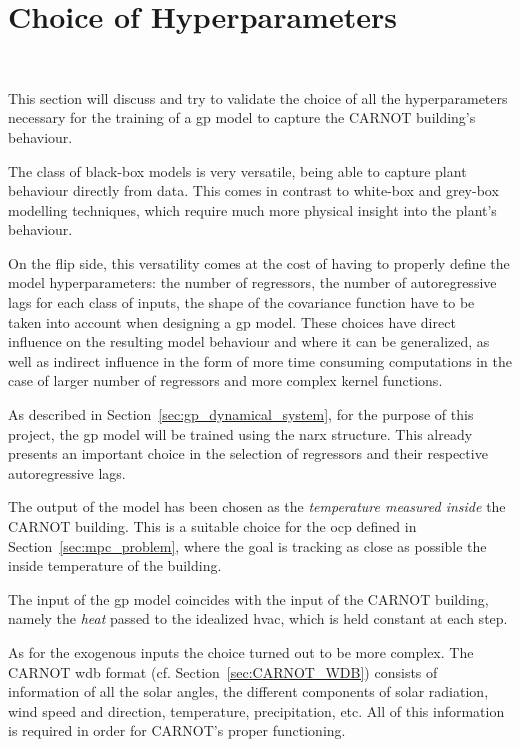 \section{Choice of Hyperparameters}~\label{sec:hyperparameters}

This section will discuss and try to validate the choice of all the
hyperparameters necessary for the training of a \acrshort{gp} model to capture
the CARNOT building's behaviour.

The class of black-box models is very versatile, being able to capture plant
behaviour directly from data. This comes in contrast to white-box and grey-box
modelling techniques, which require much more physical insight into the plant's
behaviour.

On the flip side, this versatility comes at the cost of having to properly
define the model hyperparameters: the number of regressors, the number of
autoregressive lags for each class of inputs, the shape of the covariance
function have to be taken into account when designing a \acrshort{gp} model.
These choices have direct influence on the resulting model behaviour and where
it can be generalized, as well as indirect influence in the form of more time
consuming computations in the case of larger number of regressors and more
complex kernel functions.

As described in Section~\ref{sec:gp_dynamical_system}, for the purpose of this
project, the \acrshort{gp} model will be trained using the \acrshort{narx}
structure. This already presents an important choice in the selection of
regressors and their respective autoregressive lags.

The output of the model has been chosen as the \textit{temperature measured
inside} the CARNOT building. This is a suitable choice for the \acrshort{ocp}
defined in Section~\ref{sec:mpc_problem}, where the goal is tracking as close as
possible the inside temperature of the building.

The input of the \acrshort{gp} model coincides with the input of the CARNOT
building, namely the \textit{heat} passed to the idealized \acrshort{hvac},
which is held constant at each step.

As for the exogenous inputs the choice turned out to be more complex. The CARNOT
\acrshort{wdb} format (cf. Section~\ref{sec:CARNOT_WDB}) consists of information
of all the solar angles, the different components of solar radiation, wind speed
and direction, temperature, precipitation, etc. All of this information is
required in order for CARNOT's proper functioning. 


